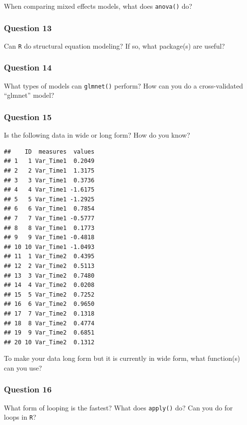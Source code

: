 \documentclass[]{tufte-book}
\theoremstyle{definition}
\theoremstyle{definition}
\theoremstyle{remark}
\begin{document}
When comparing mixed effects models, what does \texttt{anova()} do?

\subsubsection*{Question 13}\label{question-13}

Can \texttt{R} do structural equation modeling? If so, what package(s)
are useful?

\subsubsection*{Question 14}\label{question-14}

What types of models can \texttt{glmnet()} perform? How can you do a
cross-validated ``glmnet'' model?

\subsubsection*{Question 15}\label{question-15}

Is the following data in wide or long form? How do you know?

\begin{verbatim}
##    ID  measures  values
## 1   1 Var_Time1  0.2049
## 2   2 Var_Time1  1.3175
## 3   3 Var_Time1  0.3736
## 4   4 Var_Time1 -1.6175
## 5   5 Var_Time1 -1.2925
## 6   6 Var_Time1  0.7854
## 7   7 Var_Time1 -0.5777
## 8   8 Var_Time1  0.1773
## 9   9 Var_Time1 -0.4818
## 10 10 Var_Time1 -1.0493
## 11  1 Var_Time2  0.4395
## 12  2 Var_Time2  0.5113
## 13  3 Var_Time2  0.7480
## 14  4 Var_Time2  0.0208
## 15  5 Var_Time2  0.7252
## 16  6 Var_Time2  0.9650
## 17  7 Var_Time2  0.1318
## 18  8 Var_Time2  0.4774
## 19  9 Var_Time2  0.6851
## 20 10 Var_Time2  0.1312
\end{verbatim}

To make your data long form but it is currently in wide form, what
function(s) can you use?

\subsubsection*{Question 16}\label{question-16}

What form of looping is the fastest? What does \texttt{apply()} do? Can
you do for loops in \texttt{R}?
\end{document}
